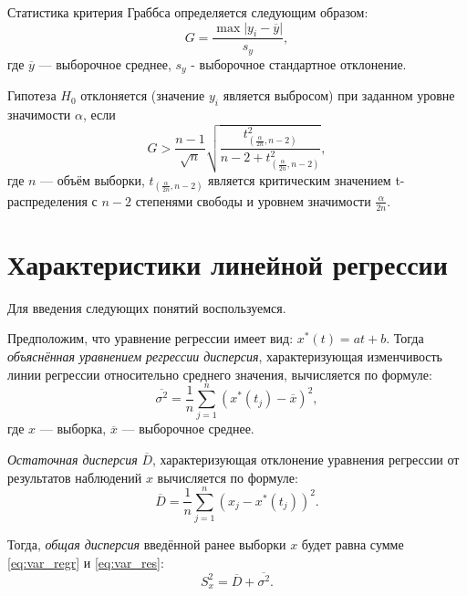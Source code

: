 Статистика критерия Граббса определяется следующим образом:
\begin{equation*}
	G = \frac{\max \vert y_i - \overline{y} \vert}{s_y},
\end{equation*}
где $\overline{y}$ --- выборочное среднее, $s_y$ - выборочное стандартное отклонение.

Гипотеза $H_0$ отклоняется (значение $y_i$ является выбросом) при заданном уровне значимости $\alpha$, если
\begin{equation*}
	G > \frac{n-1}{\sqrt{n}} \sqrt{\frac{t_{\left( \frac{\alpha}{2n}, n - 2 \right)}^2}{n - 2 + t_{\left( \frac{\alpha}{2n}, n - 2 \right)}^2}},
\end{equation*}
где $n$ --- объём выборки, $t_{\left( \frac{\alpha }{2n}, n - 2 \right)}$ является критическим значением t-распределения с $n - 2$ степенями свободы и уровнем значимости $\frac{\alpha}{2n}$.


\section*{Характеристики линейной регрессии} %
\label{sec:chars_regr}

Для введения следующих понятий воспользуемся.

Предположим, что уравнение регрессии имеет вид: $x^{*}(t) = at + b$. Тогда \textit{объяснённая уравнением регрессии дисперсия}, характеризующая изменчивость линии регрессии относительно среднего значения, вычисляется по формуле:
\begin{equation}
\label{eq:var_regr}
	\overline{\sigma^2} = \frac{1}{n} \sum_{j=1}^{n}{(x^{*}(t_j) - \overline{x})^2},
\end{equation}
где $x$ --- выборка, $\overline{x}$ --- выборочное среднее.

\textit{Остаточная дисперсия} $\overline{D}$, характеризующая отклонение уравнения регрессии от результатов наблюдений $x$ вычисляется по формуле:
\begin{equation}
\label{eq:var_res}
	\overline{D} = \frac{1}{n} \sum_{j=1}^{n}{(x_j - x^{*}(t_j))^2}.
\end{equation}

Тогда, \textit{общая дисперсия} введённой ранее выборки $x$ будет равна сумме \ref{eq:var_regr} и \ref{eq:var_res}:
\begin{equation*}
	S_x^2 = \overline{D} + \overline{\sigma^2}.
\end{equation*}

